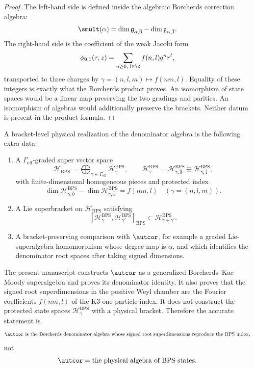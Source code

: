 \begin{proof}
The left-hand side is defined inside the algebraic Borcherds correction
algebra:
$$
\smult(\alpha)=
\dim\mathfrak g_{\alpha,\overline0}
-\dim\mathfrak g_{\alpha,\overline1}.
$$
The right-hand side is the coefficient of the weak Jacobi form
$$
\phi_{0,1}(\tau,z)=\sum_{n\geq0,\;l\in\Z}f(n,l)q^nr^l,
$$
transported to three charges by $\gamma=(n,l,m)\mapsto f(nm,l)$.  Equality
of these integers is exactly what the Borcherds product proves.  An
isomorphism of state spaces would be a linear map preserving the two
gradings and parities.  An isomorphism of algebras would additionally
preserve the brackets.  Neither datum is present in the product formula.
\end{proof}

\begin{definition}
A bracket-level physical realization of the denominator algebra is the
following extra data.
\begin{enumerate}
\item A $\Gamma_{\mathrm{eff}}$-graded super vector space
$$
\mathcal H_{\mathrm{BPS}}
=\bigoplus_{\gamma\in\Gamma_{\mathrm{eff}}}
\mathcal H_{\gamma}^{\mathrm{BPS}},
\qquad
\mathcal H_{\gamma}^{\mathrm{BPS}}
=\mathcal H_{\gamma,\overline0}^{\mathrm{BPS}}
\oplus
\mathcal H_{\gamma,\overline1}^{\mathrm{BPS}},
$$
with finite-dimensional homogeneous pieces and protected index
$$
\dim\mathcal H_{\gamma,\overline0}^{\mathrm{BPS}}
-\dim\mathcal H_{\gamma,\overline1}^{\mathrm{BPS}}
=f(nm,l)
\quad(\gamma=(n,l,m)).
$$

\item A Lie superbracket on $\mathcal H_{\mathrm{BPS}}$ satisfying
$$
[\mathcal H_\gamma^{\mathrm{BPS}},
\mathcal H_{\gamma'}^{\mathrm{BPS}}]_{\mathrm{BPS}}
\subset
\mathcal H_{\gamma+\gamma'}^{\mathrm{BPS}}.
$$

\item A bracket-preserving comparison with $\autcor$, for example a
graded Lie-superalgebra homomorphism whose degree map is $\alpha$, and
which identifies the denominator root spaces after taking signed
dimensions.
\end{enumerate}
\end{definition}

\begin{remark}[Status]
The present manuscript constructs $\autcor$ as a generalized
Borcherds--Kac--Moody superalgebra and proves its denominator identity.
It also proves that the signed root superdimensions in the positive Weyl
chamber are the Fourier coefficients $f(nm,l)$ of the K3 one-particle
index.  It does not construct the protected state spaces
$\mathcal H_{\gamma}^{\mathrm{BPS}}$ with a physical bracket.  Therefore
the accurate statement is
$$
\autcor\ \hbox{is the Borcherds denominator algebra whose signed root
superdimensions reproduce the BPS index,}
$$
not
$$
\autcor=\hbox{the physical algebra of BPS states}.
$$
\end{remark}

